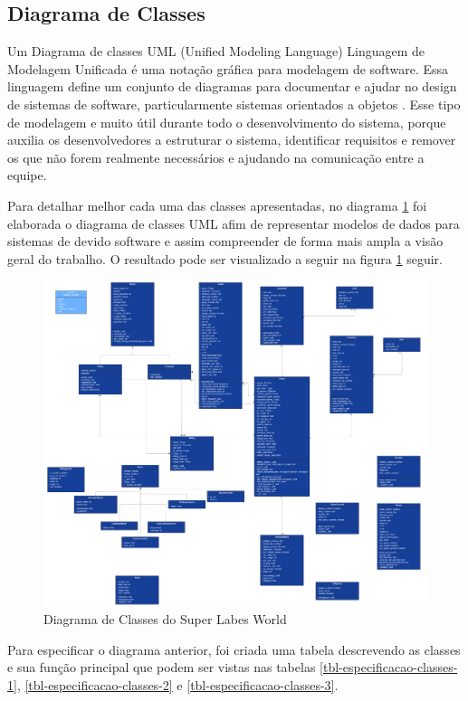 \begin{landscape}
\section{Diagrama de Classes}
\label{sec:diagrama-de-classes}
Um Diagrama de classes UML (Unified Modeling Language) Linguagem de Modelagem Unificada é uma notação gráfica para modelagem de software. Essa linguagem define um conjunto de diagramas para documentar e ajudar no design de sistemas de software, particularmente sistemas orientados a objetos \cite{engsoftmoderna}. Esse tipo de modelagem e muito útil durante todo o desenvolvimento do sistema, porque auxilia os desenvolvedores a estruturar o sistema, identificar requisitos e remover os que não forem realmente necessários e ajudando na comunicação entre a equipe.

Para detalhar melhor cada uma das classes apresentadas, no diagrama \ref{fig:diagrama-de-classes-uml} foi elaborada o diagrama de classes UML afim de representar modelos de dados para sistemas de devido software e assim compreender de forma mais ampla a visão geral do trabalho. O resultado pode ser visualizado a seguir na figura \ref{fig:diagrama-de-classes-uml}
seguir. 
\begin{figure}[h!]
    \centering
    \includegraphics[width=0.8\linewidth]{figuras/diagrama-de-classes-uml.png}
    \caption{Diagrama de Classes do Super Labes World}
    \label{fig:diagrama-de-classes-uml}
\end{figure}
\end{landscape}

Para especificar o diagrama anterior, foi criada uma tabela descrevendo as classes e sua função principal que podem ser vistas nas tabelas \ref{tbl-especificacao-classes-1}, \ref{tbl-especificacao-classes-2} e \ref{tbl-especificacao-classes-3}.

